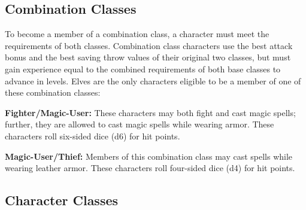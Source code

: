 \documentclass[a4paper,twoside,openany,10pt]{book}
\begin{document}
\begin{multicols}{2}
\subsection{Combination Classes}
\label{combination-classes}

To become a member of a combination class, a character must meet the requirements of both classes. Combination class characters use the best attack bonus and the best saving throw values of their original two classes, but must gain experience equal to the combined requirements of both base classes to advance in levels. Elves are the only characters eligible to be a member of one of these combination classes:

\textbf{Fighter/Magic-User:} These characters may both fight and cast magic spells; further, they are allowed to cast magic spells while wearing armor. These characters roll six-sided dice (d6) for hit points.

\textbf{Magic-User/Thief:} Members of this combination class may cast spells while wearing leather armor. These characters roll four-sided dice (d4) for hit points.

\end{multicols}

\pagebreak

\subsection{Character Classes}\label{character-classes}\hypertarget{character-classes}{}  
\end{document}
